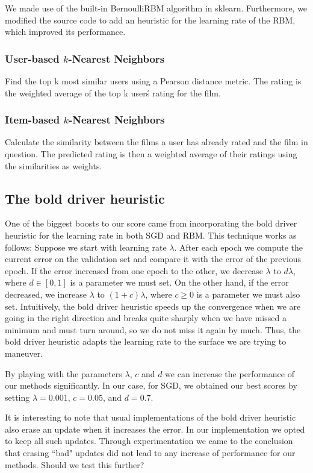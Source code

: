 \documentclass[10pt,conference,compsocconf]{IEEEtran}
\begin{document}
We made use of the built-in BernoulliRBM algorithm in sklearn. Furthermore, we modified the source code to add an heuristic for the learning rate of the RBM, which improved its performance.


\subsubsection*{\textbf{User-based $k$-Nearest Neighbors}} Find the top k most similar users using a Pearson distance metric. The rating is the weighted average of the top k user\'s rating for the film.

\subsubsection*{\textbf{Item-based $k$-Nearest Neighbors}}  Calculate the similarity between the films a user has already rated and the film in question. The predicted rating is then a weighted average of their ratings using the similarities as weights.

\subsection{The bold driver heuristic} 
One of the biggest boosts to our score came from incorporating the bold driver heuristic for the learning rate in both SGD and RBM. This technique works as follows: Suppose we start with learning rate $\lambda$. After each epoch we compute the current error on the validation set and compare it with the error of the previous epoch. If the error increased from one epoch to the other, we decrease $\lambda$ to $d\lambda$, where $d\in[0,1]$ is a parameter we must set. On the other hand, if the error decreased, we increase $\lambda$ to $(1+c)\lambda$, where $c\geq 0$ is a parameter we must also set. Intuitively, the bold driver heuristic speeds up the convergence when we are going in the right direction and breaks quite sharply when we have missed a minimum and must turn around, so we do not miss it again by much. Thus, the bold driver heuristic adapts the learning rate to the surface we are trying to maneuver.

By playing with the parameters $\lambda$, $c$ and $d$ we can increase the performance of our methods significantly. In our case, for SGD, we obtained our best scores by setting $\lambda=0.001$, $c=0.05$, and $d=0.7$.

It is interesting to note that usual implementations of the bold driver heuristic also erase an update when it increases the error. In our implementation we opted to keep all such updates. Through experimentation we came to the conclusion that erasing ``bad" updates did not lead to any increase of performance for our methods. {\color{red} Should we test this further?}
\end{document}
